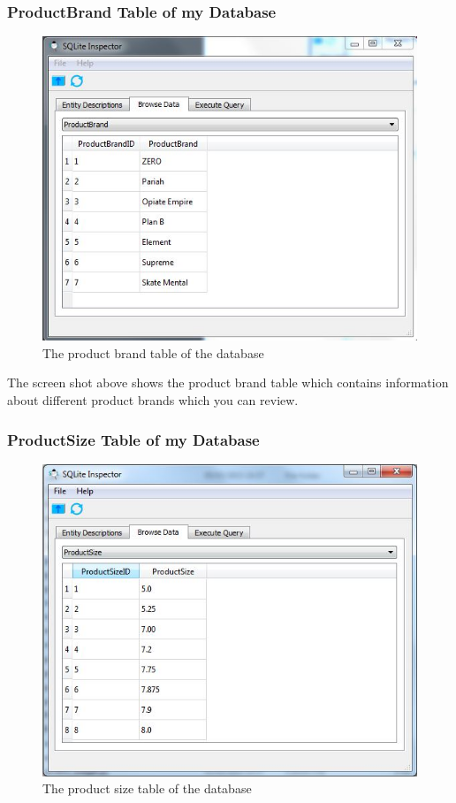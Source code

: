 \subsubsection{ProductBrand Table of my Database}
\begin{figure}[H]
    \includegraphics[width=\textwidth]{./Maintenance/Figures/ProductBrandTable.jpg}
    \caption{The product brand table of the database} \label{fig:ProductBrand Table}
\end{figure}

The screen shot above shows the product brand table which contains information about different product brands which you can review.


\subsubsection{ProductSize Table of my Database}
\begin{figure}[H]
    \includegraphics[width=\textwidth]{./Maintenance/Figures/ProductSizeTable.jpg}
    \caption{The product size table of the database} \label{fig:ProductSize Table}
\end{figure}

